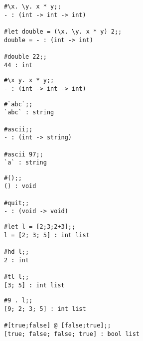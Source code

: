 
\begin{session}\begin{verbatim}
#\x. \y. x * y;;
- : (int -> int -> int)

#let double = (\x. \y. x * y) 2;;
double = - : (int -> int)

#double 22;;
44 : int
\end{verbatim}\end{session}

\begin{session}\begin{verbatim}
#\x y. x * y;;
- : (int -> int -> int)
\end{verbatim}\end{session}



\begin{session}\begin{verbatim}
#`abc`;;
`abc` : string

#ascii;;
- : (int -> string)

#ascii 97;;
`a` : string
\end{verbatim}\end{session}


\begin{session}\begin{verbatim}
#();;
() : void

#quit;;
- : (void -> void)
\end{verbatim}\end{session}



\begin{session}\begin{verbatim}
#let l = [2;3;2+3];;
l = [2; 3; 5] : int list

#hd l;;
2 : int

#tl l;;
[3; 5] : int list
\end{verbatim}\end{session}

\begin{session}\begin{verbatim}
#9 . l;;
[9; 2; 3; 5] : int list

#[true;false] @ [false;true];;
[true; false; false; true] : bool list
\end{verbatim}\end{session}

